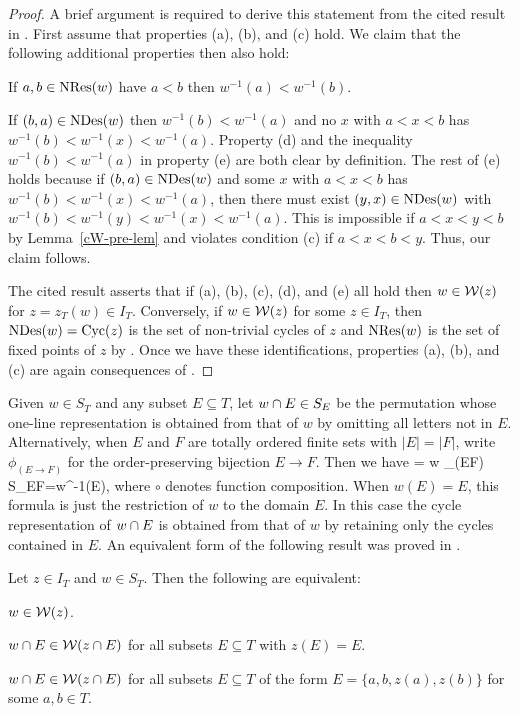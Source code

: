 \documentclass[10pt]{article}
\begin{document}
\begin{proof}
A brief argument is required to derive this statement from the cited result in \cite{CJW}.
First assume that properties (a), (b), and (c) hold. 
We claim that the following additional properties then also hold:
\ben
\item[(d)] If $a,b \in \mathrm{NRes}(w)$ have $a<b$ then $w^{-1}(a) < w^{-1}(b)$.
\item[(e)] If $(b,a) \in \mathrm{NDes}(w)$ then  $w^{-1}(b) < w^{-1}(a)$ and 
no $x$ with $a<x<b$ has $w^{-1}(b)<w^{-1}(x)<w^{-1}(a)$.
\een
Property (d) and the inequality $w^{-1}(b) < w^{-1}(a)$ in property (e) are both clear by definition.
The rest of (e) 
holds because if $(b,a) \in \mathrm{NDes}(w)$ and some $x$ with $a<x<b$ has $w^{-1}(b)<w^{-1}(x)<w^{-1}(a)$,
then there must exist $(y,x) \in \mathrm{NDes}(w)$ with $w^{-1}(b) < w^{-1}(y) < w^{-1}(x) < w^{-1}(a)$. 
 This is impossible if $a<x<y<b$ by Lemma~\ref{cW-pre-lem}
 and violates condition (c) if $a<x<b<y$.
Thus, our claim follows.


The cited result \cite[Thm.~2.5]{CJW} asserts that if (a), (b), (c), (d), and (e) all hold then 
$w \in \mathcal{W}(z)$ for $z=z_T(w) \in I_T$.
Conversely, if $w \in \mathcal{W}(z)$ for some $z \in I_T$,
then   $\mathrm{NDes}(w) = \mathrm{Cyc}(z)$ is the set of non-trivial cycles of $z$
and   $\mathrm{NRes}(w)$ is the set of fixed points of $z$ by \cite[Thm.~7.4]{Mar2019}.
Once we have these identifications, 
 properties (a), (b), and (c) are again consequences of \cite[Thm.~2.5]{CJW}.
\end{proof}

Given $w \in S_T$ and any subset $E\subseteq T$, let 
$
w\cap E \in S_E 
$
be the permutation whose one-line representation is obtained from that of $w$ by omitting all letters not in $E$. Alternatively,
when $E$ and $F$ are totally ordered finite sets with $|E|=|F|$,  write $\phi_{(E\to F)}$ for the order-preserving bijection $E\to F$. Then we have
\be
{} =  w \circ \phi_{(E\to F)} \in S_E\quad{}F=w^{-1}(E),
\ee
where $\circ$ denotes function composition.
When $w(E) = E$, this formula is just the restriction of $w$ to the domain $E$.
In this case the
 cycle representation of $w\cap E$ is obtained 
from that of $w$ by retaining only the cycles contained in $E$.
An equivalent form of the following result was proved in \cite{HMP3}.

\begin{lemma}
\label{L: W reduction}
Let $z \in I_T$ and $w \in S_T$. Then the following are equivalent:
\ben
\item[(a)] $w \in \mathcal{W}(z)$.

\item[(b)] $w\cap E \in \mathcal{W}(z\cap E)$ for all subsets $E\subseteq T$ with $z(E) = E$.

\item[(c)] $w\cap E\in \mathcal{W}(z\cap E)$ for all subsets $E\subseteq T$ of the form $E=\{a,b,z(a),z(b)\}$ for some $a,b \in T$.

\een
\end{lemma}
\end{document}
